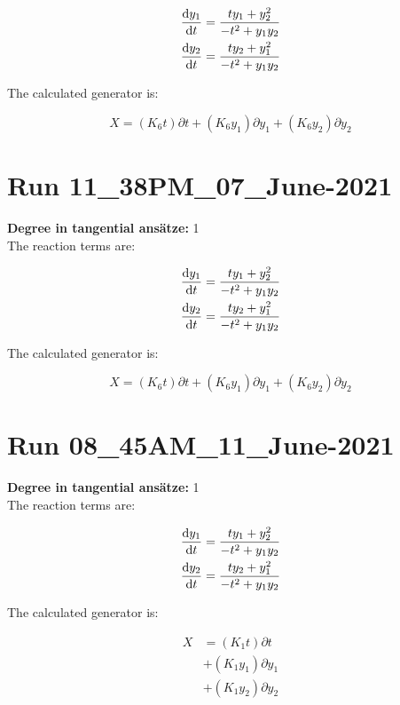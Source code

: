 \begin{align*}
\dv{y_{1}}{t}&=\frac{t y_{1} + y_{2}^{2}}{- t^{2} + y_{1} y_{2}}\\
\dv{y_{2}}{t}&=\frac{t y_{2} + y_{1}^{2}}{- t^{2} + y_{1} y_{2}}\\
\end{align*}

The calculated generator is:

\begin{equation}X=\left(K_{6} t\right)\partial t+\left(K_{6} y_{1}\right)\partial y_{1}+\left(K_{6} y_{2}\right)\partial y_{2}\end{equation}
\section*{Run 11\_38PM\_07\_June-2021}
\textbf{Degree in tangential ansätze:}	1\\
The reaction terms are:

\begin{align*}
\dv{y_{1}}{t}&=\frac{t y_{1} + y_{2}^{2}}{- t^{2} + y_{1} y_{2}}\\
\dv{y_{2}}{t}&=\frac{t y_{2} + y_{1}^{2}}{- t^{2} + y_{1} y_{2}}\\
\end{align*}

The calculated generator is:

\begin{equation}X=\left(K_{6} t\right)\partial t+\left(K_{6} y_{1}\right)\partial y_{1}+\left(K_{6} y_{2}\right)\partial y_{2}\end{equation}
\section*{Run 08\_45AM\_11\_June-2021}
\textbf{Degree in tangential ansätze:}	1\\
The reaction terms are:

\begin{align*}
\dv{y_{1}}{t}&=\frac{t y_{1} + y_{2}^{2}}{- t^{2} + y_{1} y_{2}}\\
\dv{y_{2}}{t}&=\frac{t y_{2} + y_{1}^{2}}{- t^{2} + y_{1} y_{2}}\\
\end{align*}

The calculated generator is:

\begin{align*}
X&=\left(K_{1} t\right)\partial t\\&+\left(K_{1} y_{1}\right)\partial y_{1}\\&+\left(K_{1} y_{2}\right)\partial y_{2}\\\end{align*}
